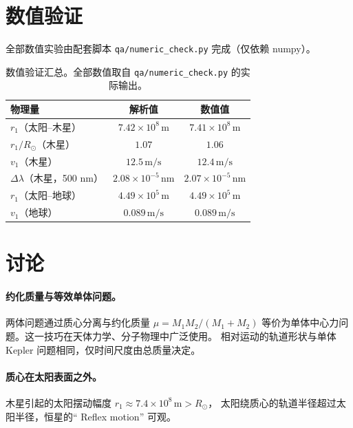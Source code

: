 \documentclass[UTF8,a4paper,11pt]{ctexart}
\begin{document}
\section{数值验证}
\label{sec:numeric}

全部数值实验由配套脚本 \texttt{qa/numeric\_check.py} 完成（仅依赖 numpy）。

\begin{table}[htbp]
\centering
\small
\begin{tabular}{p{5cm}cc}
\toprule
物理量 & 解析值 & 数值值 \\
\midrule
$r_1$（太阳--木星） & $7.42\times10^8\,\mathrm m$ & $7.41\times10^8\,\mathrm m$ \\
$r_1/R_\odot$（木星） & $1.07$ & $1.06$ \\
$v_1$（木星） & $12.5\,\mathrm{m/s}$ & $12.4\,\mathrm{m/s}$ \\
$\Delta\lambda$（木星，500 nm） & $2.08\times10^{-5}\,\mathrm{nm}$ & $2.07\times10^{-5}\,\mathrm{nm}$ \\
$r_1$（太阳--地球） & $4.49\times10^5\,\mathrm m$ & $4.49\times10^5\,\mathrm m$ \\
$v_1$（地球） & $0.089\,\mathrm{m/s}$ & $0.089\,\mathrm{m/s}$ \\
\bottomrule
\end{tabular}
\caption{数值验证汇总。全部数值取自 \texttt{qa/numeric\_check.py} 的实际输出。}
\label{tab:numeric}
\end{table}

\section{讨论}
\label{sec:discuss}

\paragraph{约化质量与等效单体问题。}
两体问题通过质心分离与约化质量 $\mu=M_1M_2/(M_1+M_2)$
等价为单体中心力问题。这一技巧在天体力学、分子物理中广泛使用。
相对运动的轨道形状与单体 Kepler 问题相同，仅时间尺度由总质量决定。

\paragraph{质心在太阳表面之外。}
木星引起的太阳摆动幅度 $r_1\approx7.4\times10^8\,\mathrm m>R_\odot$，
太阳绕质心的轨道半径超过太阳半径，恒星的`` Reflex motion'' 可观。
\end{document}
